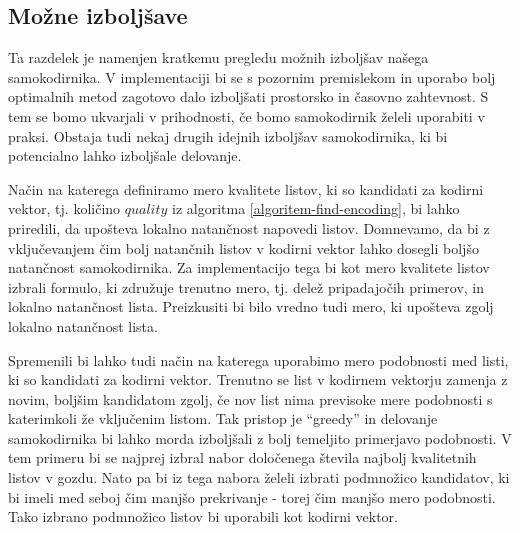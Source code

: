 \documentclass[12pt,a4paper,twoside]{article}
\theoremstyle{definition} %
\theoremstyle{plain} %
\numberwithin{equation}{section}  %
\begin{document}


\subsection{Možne izboljšave}
\label{mozne-izboljsave}


Ta razdelek je namenjen kratkemu pregledu možnih izboljšav našega samokodirnika.
V implementaciji bi se s pozornim premislekom in uporabo bolj optimalnih metod zagotovo dalo izboljšati prostorsko in časovno zahtevnost.
S tem se bomo ukvarjali v prihodnosti, če bomo samokodirnik želeli uporabiti v praksi.
Obstaja tudi nekaj drugih idejnih izboljšav samokodirnika, ki bi potencialno lahko izboljšale delovanje.

Način na katerega definiramo mero kvalitete listov, ki so kandidati za kodirni vektor, tj. količino $quality$ iz algoritma \ref{algoritem-find-encoding},
bi lahko priredili, da upošteva lokalno natančnost napovedi listov.
Domnevamo, da bi z vključevanjem čim bolj natančnih listov v kodirni vektor lahko dosegli boljšo natančnost samokodirnika.
Za implementacijo tega bi kot mero kvalitete listov izbrali formulo, ki združuje trenutno mero, tj. delež pripadajočih primerov, in lokalno natančnost lista.
Preizkusiti bi bilo vredno tudi mero, ki upošteva zgolj lokalno natančnost lista.

Spremenili bi lahko tudi način na katerega uporabimo mero podobnosti med listi, ki so kandidati za kodirni vektor.
Trenutno se list v kodirnem vektorju zamenja z novim, boljšim kandidatom zgolj, če nov list nima previsoke mere podobnosti s katerimkoli že vključenim listom.
Tak pristop je ``greedy'' in delovanje samokodirnika bi lahko morda izboljšali z bolj temeljito primerjavo podobnosti.
V tem primeru bi se najprej izbral nabor določenega števila najbolj kvalitetnih listov v gozdu.
Nato pa bi iz tega nabora želeli izbrati podmnožico kandidatov, ki bi imeli med seboj čim manjšo prekrivanje - torej čim manjšo mero podobnosti.
Tako izbrano podmnožico listov bi uporabili kot kodirni vektor.
\end{document}
